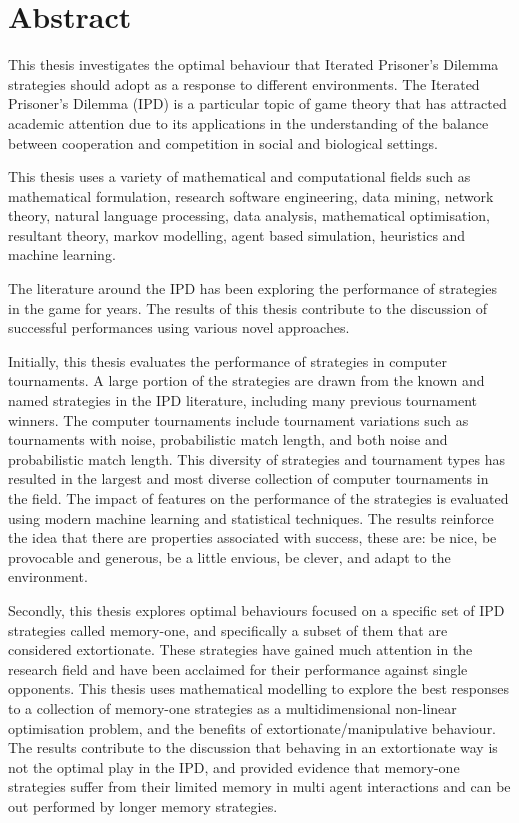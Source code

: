 \chapter{Abstract}

This thesis investigates the optimal behaviour that Iterated Prisoner's Dilemma
strategies should adopt as a response to different environments. The Iterated
Prisoner's Dilemma (IPD) is a particular topic of game theory that has attracted
academic attention due to its applications in the understanding of
the balance between cooperation and competition in social and biological
settings.

This thesis uses a variety of mathematical and computational fields such as
mathematical formulation, research software engineering, data mining, network
theory, natural language processing, data analysis, mathematical
optimisation, resultant theory, markov modelling, agent based simulation,
heuristics and machine learning.

The literature around the IPD has been exploring the performance of strategies
in the game for years. The results of this thesis contribute to the discussion
of successful performances using various novel approaches.

Initially, this thesis evaluates the performance of \numberofstrategies
strategies in \numberofalltournaments computer tournaments. A large portion of
the \numberofstrategies strategies are drawn from the known and named strategies in the IPD
literature, including many previous tournament winners. The \numberofalltournaments
computer tournaments include tournament variations such as tournaments with
noise, probabilistic match length, and both noise and probabilistic match
length. This diversity of strategies and tournament types has resulted in the largest and
most diverse collection of computer tournaments in the field. The impact of
features on the performance of the \numberofstrategies strategies is evaluated
using modern machine learning and statistical techniques. The results reinforce
the idea that there are properties associated with success, these are: be nice,
be provocable and generous, be a little envious, be clever, and adapt to the
environment.

Secondly, this thesis explores optimal behaviours focused on a specific set of
IPD strategies called memory-one, and specifically a subset of them that are
considered extortionate. These strategies have gained much attention in the
research field and have been acclaimed for their performance against single
opponents. This thesis uses  mathematical modelling to explore the best
responses to a collection of memory-one strategies as a multidimensional non-linear
optimisation problem, and the benefits of extortionate/manipulative
behaviour. The results contribute to the discussion that behaving in an
extortionate way is not the optimal play in the IPD, and provided evidence that
memory-one strategies suffer from their limited memory in multi agent
interactions and can be out performed by longer memory strategies.

